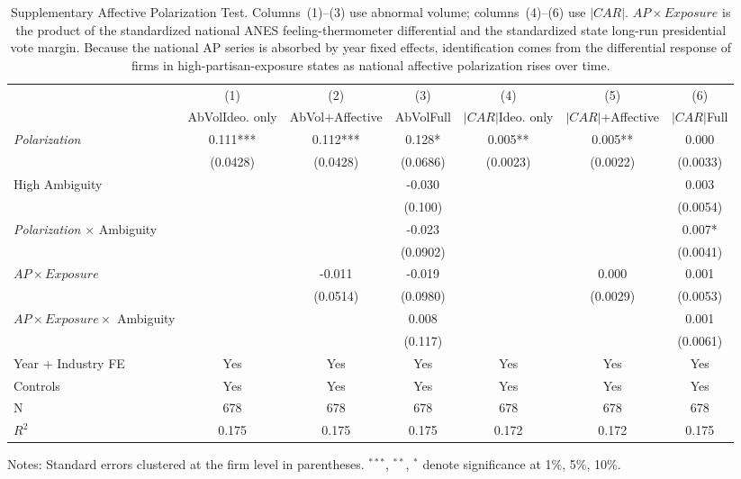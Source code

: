 \begin{table}[htbp]
\centering
\caption{Supplementary Affective Polarization Test. Columns~(1)--(3) use abnormal volume; columns~(4)--(6) use $|CAR|$. $AP \times Exposure$ is the product of the standardized national ANES feeling-thermometer differential and the standardized state long-run presidential vote margin. Because the national AP series is absorbed by year fixed effects, identification comes from the differential response of firms in high-partisan-exposure states as national affective polarization rises over time.}
\label{tab:affective}
\begin{tabular}{lcccccc}
\toprule
 & (1) & (2) & (3) & (4) & (5) & (6) \\
 & AbVol\newline Ideo. only & AbVol\newline +Affective & AbVol\newline Full & $|CAR|$\newline Ideo. only & $|CAR|$\newline +Affective & $|CAR|$\newline Full \\
\midrule
\textit{Polarization} & 0.111*** & 0.112*** & 0.128* & 0.005** & 0.005** & 0.000 \\
 & (0.0428) & (0.0428) & (0.0686) & (0.0023) & (0.0022) & (0.0033) \\
High Ambiguity &  &  & -0.030 &  &  & 0.003 \\
 &  &  & (0.100) &  &  & (0.0054) \\
\textit{Polarization} $\times$ Ambiguity &  &  & -0.023 &  &  & 0.007* \\
 &  &  & (0.0902) &  &  & (0.0041) \\
$AP \times Exposure$ &  & -0.011 & -0.019 &  & 0.000 & 0.001 \\
 &  & (0.0514) & (0.0980) &  & (0.0029) & (0.0053) \\
$AP \times Exposure \times$ Ambiguity &  &  & 0.008 &  &  & 0.001 \\
 &  &  & (0.117) &  &  & (0.0061) \\
\midrule
Year + Industry FE & Yes & Yes & Yes & Yes & Yes & Yes \\
Controls & Yes & Yes & Yes & Yes & Yes & Yes \\
N & 678 & 678 & 678 & 678 & 678 & 678 \\
$R^2$ & 0.175 & 0.175 & 0.175 & 0.172 & 0.172 & 0.175 \\
\bottomrule
\end{tabular}
\begin{flushleft}
\footnotesize Notes: Standard errors clustered at the firm level in parentheses. $^{***}$, $^{**}$, $^{*}$ denote significance at 1\%, 5\%, 10\%.
\end{flushleft}
\end{table}